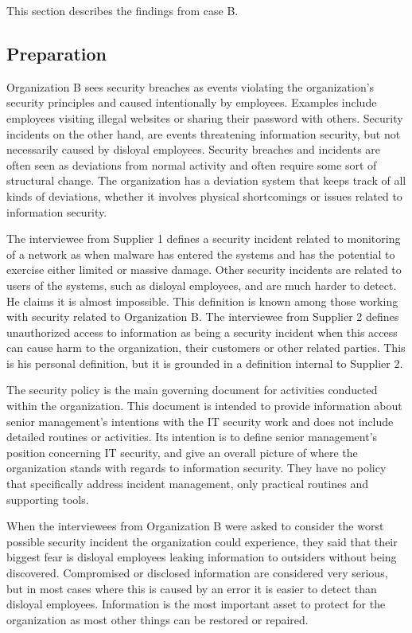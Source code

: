 This section describes the findings from case B.

\subsection{Preparation}
Organization B sees security breaches as events violating the organization's security principles and caused intentionally by employees. Examples include employees visiting illegal websites or sharing their password with others. Security incidents on the other hand, are events threatening information security, but not necessarily caused by disloyal employees. Security breaches and incidents are often seen as deviations from normal activity and often require some sort of structural change. The organization has a deviation system that keeps track of all kinds of deviations, whether it involves physical shortcomings or issues related to information security.

The interviewee from Supplier 1 defines a security incident related to monitoring of a network as when malware has entered the systems and has the potential to exercise either limited or massive damage. Other security incidents are related to users of the systems, such as disloyal employees, and are much harder to detect. He claims it is almost impossible. This definition is known among those working with security related to Organization B. The interviewee from Supplier 2 defines unauthorized access to information as being a security incident when this access can cause harm to the organization, their customers or other related parties. This is his personal definition, but it is grounded in a definition internal to Supplier 2.

The security policy is the main governing document for activities conducted within the organization. This document is intended to provide information about senior management's intentions with the IT security work and does not include detailed routines or activities. Its intention is to define senior management's position concerning IT security, and give an overall picture of where the organization stands with regards to information security. They have no policy that specifically address incident management, only practical routines and supporting tools.

When the interviewees from Organization B were asked to consider the worst possible security incident the organization could experience, they said that their biggest fear is disloyal employees leaking information to outsiders without being discovered. Compromised or disclosed information are considered very serious, but in most cases where this is caused by an error it is easier to detect than disloyal employees. Information is the most important asset to protect for the organization as most other things can be restored or repaired.

